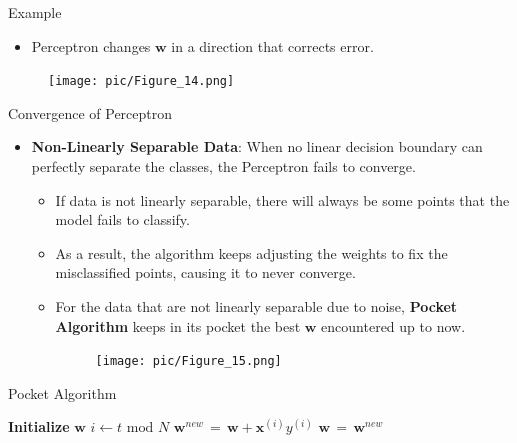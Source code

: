 \documentclass[serif, aspectratio=169]{beamer}
\begin{document}
\begin{frame}{Example}
    \begin{itemize}
        \item Perceptron changes \(\mathbf{w}\) in a direction that corrects error.
    \end{itemize}
    \begin{figure}
        \centering
        \texttt{[image: pic/Figure\_14.png]}
    \end{figure}
\end{frame}

\begin{frame}{Convergence of Perceptron}
    \begin{itemize}\itemsep1.5em
        \item \textbf{Non-Linearly Separable Data}:
        When no linear decision boundary can perfectly separate the classes, the Perceptron fails to converge.
        \medskip
        \begin{itemize}\itemsep1em
            \item If data is not linearly separable, there will always be some points that the model fails to classify.
            \item As a result, the algorithm keeps adjusting the weights to fix the misclassified points, causing it to never converge.
            \item For the data that are not linearly separable due to noise, \textbf{Pocket Algorithm} keeps in its pocket the best \(\mathbf{w}\) encountered up to now.
        \endminipage
        \hspace{1.5cm}
        \begin{figure}
            \centering
            \texttt{[image: pic/Figure\_15.png]}
        \end{figure}
        \endminipage
        \end{itemize}
    \end{itemize}
\end{frame}

\begin{frame}{Pocket Algorithm}
    \begin{algorithm}[H]
    \caption{Pocket Algorithm}\label{alg:Pocket Algorithm}
    \begin{algorithmic}[1]
        \State \textbf{Initialize} $\mathbf{w}$
            \State \(i \leftarrow t \text{ mod } N\)
            \State \(\mathbf{w}^{new} \, = \, \mathbf{w} + \mathbf{x}^{(i)}y^{(i)}\)
            \State \(\mathbf{w} \, = \, \mathbf{w}^{new}\)
            \EndIf
            \EndIf
        \EndFor
    \end{algorithmic}
    \end{algorithm}
\end{frame}
\end{document}
